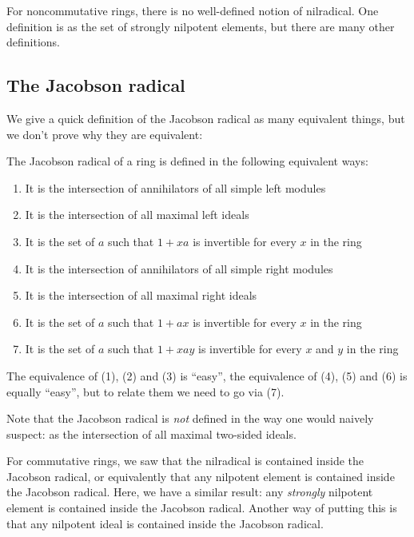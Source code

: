 \documentclass[a4paper]{amsart}
\begin{document}
For noncommutative rings, there is no well-defined notion of
nilradical. One definition is as the set of strongly nilpotent
elements, but there are many other definitions. 

\subsection{The Jacobson radical}

We give a quick definition of the Jacobson radical as many equivalent
things, but we don't prove why they are equivalent:

\begin{definer}
  The Jacobson radical of a ring is defined in the following
  equivalent ways:

  \begin{enumerate}

  \item It is the intersection of annihilators of all simple left
    modules

  \item It is the intersection of all maximal left ideals

  \item It is the set of $a$ such that $1 + xa$ is invertible for
    every $x$ in the ring

  \item It is the intersection of annihilators of all simple right
    modules

  \item It is the intersection of all maximal right ideals

  \item It is the set of $a$ such that $1 + ax$ is invertible for
    every $x$ in the ring

  \item It is the set of $a$ such that $1 + xay$ is invertible for
    every $x$ and $y$ in the ring

  \end{enumerate}

  The equivalence of (1), (2) and (3) is ``easy'', the equivalence of
  (4), (5) and (6) is equally ``easy'', but to relate them we need to
  go via (7).
\end{definer}

Note that the Jacobson radical is {\em not} defined in the way one
would naively suspect: as the intersection of all maximal two-sided
ideals.

For commutative rings, we saw that the nilradical is contained inside
the Jacobson radical, or equivalently that any nilpotent element is
contained inside the Jacobson radical. Here, we have a similar result:
any {\em strongly} nilpotent element is contained inside the Jacobson
radical. Another way of putting this is that any nilpotent ideal is
contained inside the Jacobson radical.
\end{document}
